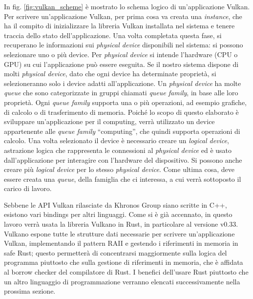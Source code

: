 In fig. \ref{fig:vulkan_scheme} è mostrato lo schema logico di un'applicazione Vulkan. 
Per scrivere un'applicazione Vulkan, per prima cosa va creata una \textit{instance}, che ha il compito di inizializzare la libreria Vulkan installata nel sistema e tenere traccia dello stato dell'applicazione. Una volta completata questa fase, si recuperano le informazioni sui \textit{physical device} disponibili nel sistema: si possono selezionare uno o più device. Per \textit{physical device} si intende l'hardware (CPU o GPU) su cui l'applicazione può essere eseguita. Se il nostro sistema dispone di molti \textit{physical device}, dato che ogni device ha determinate proprietà, si selezioneranno solo i device adatti all'applicazione. Un \textit{physical device} ha molte \textit{queue} che sono categorizzate in gruppi chiamati \textit{queue family}, in base alle loro proprietà. Ogni \textit{queue family} supporta una o più operazioni, ad esempio grafiche, di calcolo o di trasferimento di memoria. Poiché lo scopo di questo elaborato è sviluppare un'applicazione per il computing, verrà utilizzato un device appartenente alle \textit{queue family} ``computing'', che quindi supporta operazioni di calcolo. Una volta selezionato il device è necessario creare un \textit{logical device}, astrazione logica che rappresenta le connessioni al \textit{physical device} ed è usato dall'applicazione per interagire con l'hardware del dispositivo. Si possono anche creare più \textit{logical device} per lo stesso \textit{physical device}. Come ultima cosa, deve essere creata una \textit{queue}, della famiglia che ci interessa, a cui verrà sottoposto il carico di lavoro.

Sebbene le API Vulkan rilasciate da Khronos Group siano scritte in C++, esistono vari bindings per altri linguaggi. Come si è già accennato, in questo lavoro verrà usata la libreria Vulkano in Rust, in particolare al versione v0.33. Vulkano espone tutte le strutture dati necessarie per scrivere un'applicazione Vulkan, implementando il pattern \gls{RAII} e gestendo i riferimenti in memoria in safe Rust; questo permetterà di concentrarsi maggiormente sulla logica del programma piuttosto che sulla gestione di riferimenti in memoria, che è affidata al borrow checker \cite[]{Rust:borrow_checker} del compilatore di Rust. I benefici dell'usare Rust piuttosto che un altro linguaggio di programmazione verranno elencati successivamente nella prossima sezione.

